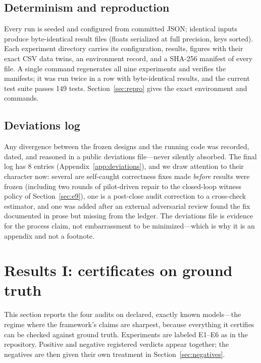 \documentclass[11pt]{article}
\theoremstyle{definition}
\begin{document}
\subsection{Determinism and reproduction}
\label{sec:methods-repro}

Every run is seeded and configured from committed JSON; identical inputs produce byte-identical result files (floats serialized at full precision, keys sorted). Each experiment directory carries its configuration, results, figures with their exact CSV data twins, an environment record, and a SHA-256 manifest of every file. A single command regenerates all nine experiments and verifies the manifests; it was run twice in a row with byte-identical results, and the current test suite passes 149 tests. Section~\ref{sec:repro} gives the exact environment and commands.

\subsection{Deviations log}
\label{sec:methods-deviations}

Any divergence between the frozen designs and the running code was recorded, dated, and reasoned in a public deviations file---never silently absorbed. The final log has 8 entries (Appendix~\ref{app:deviations}), and we draw attention to their character now: several are self-caught correctness fixes made \emph{before} results were frozen (including two rounds of pilot-driven repair to the closed-loop witness policy of Section~\ref{sec:e9}), one is a post-close audit correction to a cross-check estimator, and one was added after an external adversarial review found the fix documented in prose but missing from the ledger. The deviations file is evidence for the process claim, not embarrassment to be minimized---which is why it is an appendix and not a footnote. 

 \section{Results I: certificates on ground truth}
\label{sec:results-certificates}

This section reports the four audits on declared, exactly known models---the regime where the framework's claims are sharpest, because everything it certifies can be checked against ground truth. Experiments are labeled E1--E6 as in the repository. Positive and negative registered verdicts appear together; the negatives are then given their own treatment in Section~\ref{sec:negatives}.
\end{document}
